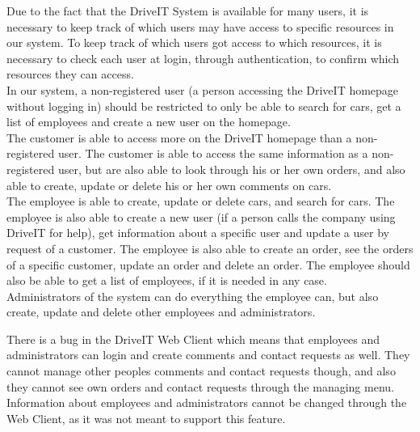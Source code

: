 Due to the fact that the DriveIT System is available for many users, it is necessary to keep track of which users may have access to specific resources in our system. To keep track of which users got access to which resources, it is necessary to check each user at login, through authentication, to confirm which resources they can access.\\

In our system, a non-registered user (a person accessing the DriveIT homepage without logging in) should be restricted to only be able to search for cars, get a list of employees and create a new user on the homepage.\\

The customer is able to access more on the DriveIT homepage than a non-registered user. The customer is able to access the same information as a non-registered user, but are also able to look through his or her own orders, and also able to create, update or delete his or her own comments on cars.\\

The employee is able to create, update or delete cars, and search for cars. The employee is also able to create a new user (if a person calls the company using DriveIT for help), get information about a specific user and update a user by request of a customer. The employee is also able to create an order, see the orders of a specific customer, update an order and delete an order. The employee should also be able to get a list of employees, if it is needed in any case.\\

Administrators of the system can do everything the employee can, but also create, update and delete other employees and administrators.

There is a bug in the DriveIT Web Client which means that employees and administrators can login and create comments and contact requests as well. They cannot manage other peoples comments and contact requests though, and also they cannot see own orders and contact requests through the managing menu. Information about employees and administrators cannot be changed through the Web Client, as it was not meant to support this feature.